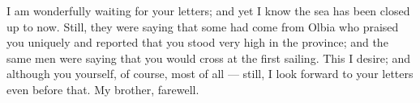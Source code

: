  I am wonderfully waiting for your letters; and yet I know the sea has been closed up to now. Still, they were saying that some had come from Olbia who praised you uniquely and reported that you stood very high in the province; and the same men were saying that you would cross at the first sailing. This I desire; and although you yourself, of course, most of all --- still, I look forward to your letters even before that. My brother, farewell.
